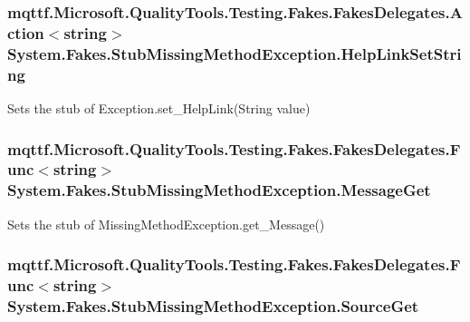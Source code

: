 \hypertarget{class_system_1_1_fakes_1_1_stub_missing_method_exception_ac32da577a544d47a120d62ff71f89f53}{
\subsubsection[{Help\-Link\-Set\-String}]{\setlength{\rightskip}{0pt plus 5cm}mqttf.\-Microsoft.\-Quality\-Tools.\-Testing.\-Fakes.\-Fakes\-Delegates.\-Action$<$string$>$ System.\-Fakes.\-Stub\-Missing\-Method\-Exception.\-Help\-Link\-Set\-String}}\label{class_system_1_1_fakes_1_1_stub_missing_method_exception_ac32da577a544d47a120d62ff71f89f53}


Sets the stub of Exception.\-set\-\_\-\-Help\-Link(\-String value)

\hypertarget{class_system_1_1_fakes_1_1_stub_missing_method_exception_aa6fa9e4136f1e69a9a823f84a199c7f9}{
\subsubsection[{Message\-Get}]{\setlength{\rightskip}{0pt plus 5cm}mqttf.\-Microsoft.\-Quality\-Tools.\-Testing.\-Fakes.\-Fakes\-Delegates.\-Func$<$string$>$ System.\-Fakes.\-Stub\-Missing\-Method\-Exception.\-Message\-Get}}\label{class_system_1_1_fakes_1_1_stub_missing_method_exception_aa6fa9e4136f1e69a9a823f84a199c7f9}


Sets the stub of Missing\-Method\-Exception.\-get\-\_\-\-Message()

\hypertarget{class_system_1_1_fakes_1_1_stub_missing_method_exception_a508040e6d946819498026aaa943a9301}{
\subsubsection[{Source\-Get}]{\setlength{\rightskip}{0pt plus 5cm}mqttf.\-Microsoft.\-Quality\-Tools.\-Testing.\-Fakes.\-Fakes\-Delegates.\-Func$<$string$>$ System.\-Fakes.\-Stub\-Missing\-Method\-Exception.\-Source\-Get}}\label{class_system_1_1_fakes_1_1_stub_missing_method_exception_a508040e6d946819498026aaa943a9301}



